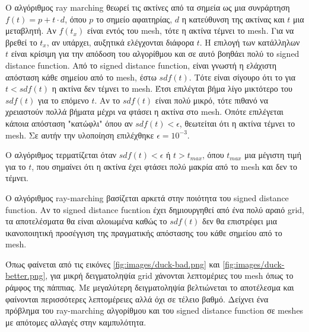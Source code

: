 \documentclass{report}
\begin{document}
Ο αλγόριθμος ray marching θεωρεί τις ακτίνες από τα σημεία ως μια συνράρτηση $f(t) = p + t \cdot d$, όπου $p$ το σημείο
αφαιτηρίας, $d$ η κατεύθυνση της ακτίνας και $t$ μια μεταβλητή. Αν $f(t_x)$ είναι εντός του mesh, τότε η ακτίνα τέμνει το mesh.
Για να βρεθεί το $t_x$, αν υπάρχει, αυξητικά ελέγχονται διάφορα $t$. Η επιλογή των κατάλληλων $t$ είναι κρίσιμη για την
απόδοση του αλγορίθμου και σε αυτό βοηθάει πολύ το signed distance function. Από το signed distance function, είναι 
γνωστή η ελάχιστη απόσταση κάθε σημείου από το mesh, έστω ${sdf}(t)$. Τότε είναι σίγουρο ότι το για $t < {sdf}(t)$ η ακτίνα
δεν τέμνει το mesh. Έτσι επιλέγται βήμα λίγο μικτότερο του ${sdf}(t)$ για το επόμενο $t$. Αν το ${sdf}(t)$ είναι πολύ μικρό,
τότε πιθανό να χρειαστούν πολλά βήματα μέχρι να φτάσει η ακτίνα στο mesh. Οπότε επιλέγεται κάποια απόσταση "κατώφλι" όπου
αν ${sdf}(t) < \epsilon$, θεωτείται ότι η ακτίνα τέμνει το mesh. Σε αυτήν την υλοποίηση επιλέχθηκε $\epsilon = 10^{-3}$.
\cite{ray-marching}


Ο αλγόριθμος τερματίζεται όταν ${sdf}(t) < \epsilon$ ή $t > t_{max}$, όπου $t_{max}$ μια μέγιστη τιμή για το $t$, που σημαίνει
ότι η ακτίνα έχει φτάσει πολύ μακρία από το mesh και δεν το τέμνει.


Ο αλγόριθμος ray-marching βασίζεται αρκετά στην ποιότητα του signed distance function. Αν το signed distance fucntion έχει
δημιουργηθεί από ένα πολύ αραιό grid, τα αποτελέσματα θα είναι αλοιωμένα καθώς το ${sdf}(t)$ δεν θα επιστρέφει μια
ικανοποιητική προσέγγιση της πραγματικής απόστασης του κάθε σημείου από το mesh.

 \label{fig:duck}

Όπως φαίνεται από τις εικόνες \ref{fig:images/duck-bad.png} και \ref{fig:images/duck-better.png}, για μικρή δειγματοληψία grid 
χάνονται λεπτομέριες του mesh όπως το ράμφος της πάππιας. Με μεγαλύτερη δειγματοληψία βελτιώνεται το αποτέλεσμα και 
φαίνονται περισσότερες λεπτομέρειες αλλά όχι σε τέλειο βαθμό. Δείχνει ένα πρόβλημα του ray-marching αλγορίθμου και 
του signed distance function σε meshes με απότομες αλλαγές στην καμπυλότητα.
\end{document}
